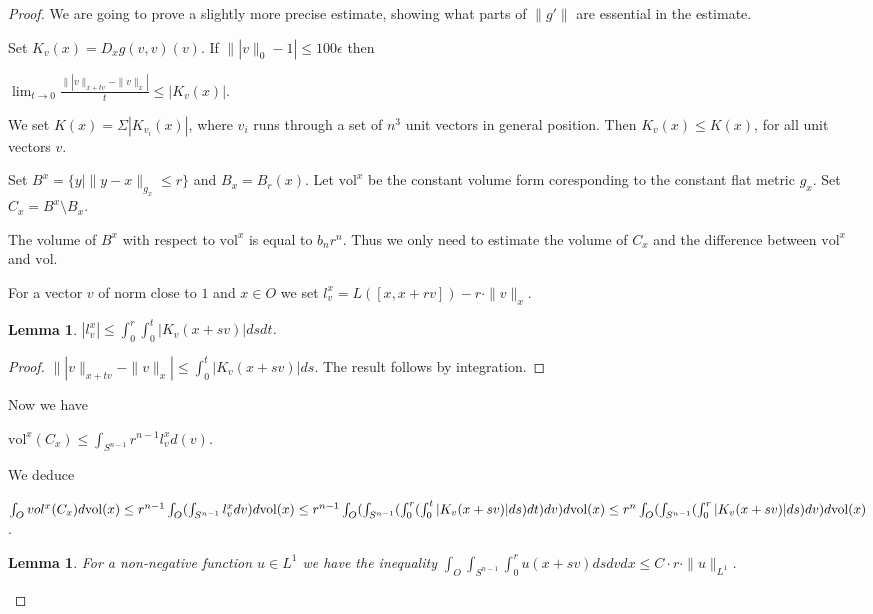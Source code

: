 \documentclass[12pt,leqno]{amsart}
\numberwithin{equation}{section}
\newtheorem{lem}[thm]{Lemma}
\theoremstyle{definition}
\theoremstyle{remark}
\newcommand{\vol}{\mathrm{vol}}
\begin{document}
 \begin{proof}
 We are going to prove a slightly more precise estimate, showing what parts of $\|g'\|$ are essential in the estimate.


 Set $K_v (x) = D_x g(v,v) (v)$.  If $\||v\|_0 -1| \leq 100\epsilon$  then

 $\lim _{t\to 0} \frac {\||v\|_{x+tv} - \|v\| _x|} t \leq |K_v (x)|$.

 We set $K(x)= \Sigma |K_{v_i}(x)|$, where $v_i$ runs through a set of $n^3$ unit vectors in general position.
 Then $K_v(x) \leq K (x)$, for all unit vectors $v$.

 Set $B^x = \{ y | \|y-x\| _{g_x} \leq r \}$ and $B_x = B_r (x)$.  Let $\vol ^x$ be the constant
 volume form coresponding to the constant flat metric $g_x$.
   Set $C_x = B^x \setminus B_x$.

   The volume of $B^x$ with respect to $\vol ^x$ is equal to $b_n r^n$. Thus we only need to estimate
  the volume of $C_x$ and the difference between $\vol ^x$ and $\vol$.

 For a vector $v$ of norm close to $1$ and $x\in O$ we set
 $l_v ^x = L ([x,x+rv]) - r \cdot \| v\| _x$.

 \begin{lem}
 $|l_v ^x| \leq \int _0 ^r  \int _0 ^t | K_v (x+sv)| ds dt$.
 \end{lem}


 \begin{proof}
 $\||v\|_{x+tv} -\|v\| _x| \leq \int _0 ^t  |K_v (x+sv)| ds$. The result follows by integration.
  \end{proof}


   Now we have

   $\vol ^x (C_x) \leq \int _{S^{n-1}} r^{n-1} l^x _v d(v) $.


    We deduce

    $\int _O vol ^x (C_x) d\vol (x) \leq r^{n-1} \int _O (\int _{S^{n-1}} l_v ^x dv) d\vol (x) \leq \\
    r^{n-1} \int _O (\int _{S^{n-1}} (\int _0 ^r (\int _0 ^t |K_v (x+sv)| ds)dt)dv)d\vol (x) \leq \\
    r^n \int _O (\int _{S^{n-1}} (\int _0 ^r |K_v (x+sv)| ds) dv)d\vol (x)$.


    \begin{lem}
    For a non-negative function $u\in L^1$ we have the inequality
    $\int _O \int _{S^{n-1}} \int _0^r u(x+sv) ds dv dx \leq C \cdot r \cdot \|u\| _{L^1}$.
    \end{lem}



\end{proof}
\end{document}
